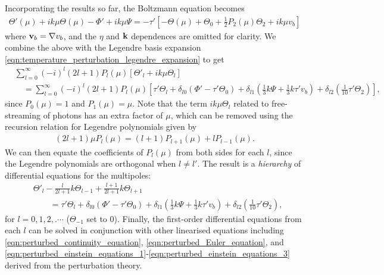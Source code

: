 Incorporating the results so far, the Boltzmann equation becomes 
\begin{align}
	\Theta'(\mu) + ik\mu \Theta(\mu) - \Phi' + ik\mu\Psi = -\tau' \left[ - \Theta(\mu) + \Theta_0 + \frac{1}{2}P_2(\mu)\Theta_2 + ik\mu v_b \right] \label{eqn:boltzmann_equation_in_fourier_space}
\end{align}
where $\mathbf{v}_b = \nabla v_b$, and the $\eta$ and $\mathbf{k}$ dependences are omitted for clarity. We combine the above with the Legendre basis expansion \eqref{eqn:temperature_perturbation_legendre_expansion} to get
\begin{align}
	&\sum_{l=0}^{\infty} (-i)^l (2l+1) P_l (\mu) \left[ \Theta'_l + ik\mu \Theta_l \right] \nonumber\\
	&\quad= \sum_{l=0}^{\infty} (-i)^l (2l+1) P_l (\mu) \left[ \tau' \Theta_l + \delta_{l0} (\Phi' - \tau'\Theta_0) + \delta_{l1} (\frac{1}{3}k\Psi + \frac{1}{3}k\tau' v_b) + \delta_{l2}(\frac{1}{10}\tau' \Theta_2) \right],
\end{align}
since $P_0(\mu) = 1$ and $P_1(\mu)=\mu$. Note that the term $ik\mu \Theta_l$ related to free-streaming of photons has an extra factor of $\mu$, which can be removed using the recursion relation for Legendre polynomials given by
\begin{align}
	(2l+1)\mu P_l(\mu) = (l+1) P_{l+1} (\mu) + l P_{l-1} (\mu).
\end{align}
We can then equate the coefficients of $P_l(\mu)$ from both sides for each $l$, since the Legendre polynomials are orthogonal when $l\neq l'$. The result is a \textit{hierarchy} of differential equations for the multipoles:
\begin{align}
	&\Theta'_l - \frac{l}{2l+1} k\Theta_{l-1} + \frac{l+1}{2l+1} k\Theta_{l+1}  \nonumber\\
	&\qquad= \tau' \Theta_l + \delta_{l0} (\Phi' - \tau' \Theta_0) + \delta_{l1} (\frac{1}{3} k\Psi + \frac{1}{3} k\tau' v_b) + \delta_{l2}(\frac{1}{10}\tau' \Theta_2),
\end{align}
for $l=0,1,2,.\cdots$ ($\Theta_{-1}$ set to $0$). Finally, the first-order differential equations from each $l$ can be solved in conjunction with other linearised equations including \eqref{eqn:perturbed_continuity_equation}, \eqref{eqn:perturbed_Euler_equation}, and \eqref{eqn:perturbed_einstein_equations_1}-\eqref{eqn:perturbed_einstein_equations_3} derived from the perturbation theory.

